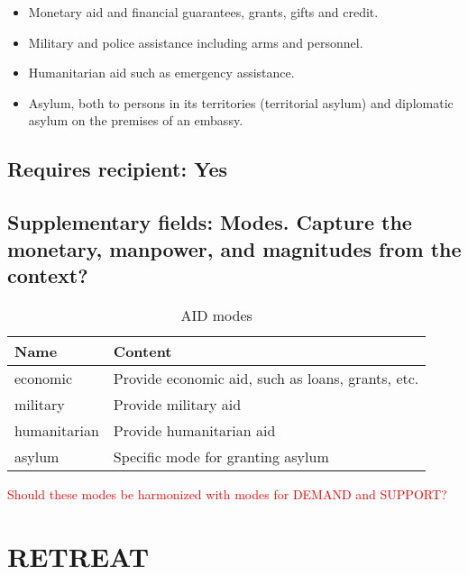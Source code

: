 \documentclass[11pt]{report}
\newcommand{\plcat}[1]{\textsf{#1}}
\newcommand{\andy}[1]{\textcolor{red}{#1}}
\begin{document}
\begin{itemize}

\item Monetary aid and financial guarantees, grants, gifts and credit.

\item Military and police assistance including arms and personnel.

\item Humanitarian aid such as emergency assistance.

\item Asylum, both to persons in its territories (territorial asylum) and diplomatic asylum on the premises of an embassy.

\end{itemize}

\subsection{Requires recipient: Yes}

\subsection{Supplementary fields: Modes. Capture the monetary, manpower, and magnitudes from the context?}

\begin{table}[htp]
\color{red}
\caption{AID modes}
\begin{center}
\begin{tabular}{|l|p{13cm}|}
\hline
Name & Content \\
\hline
economic & Provide economic aid, such as loans, grants, etc.\\
military & Provide military aid \\
humanitarian & Provide humanitarian aid \\
asylum & Specific mode for granting asylum\\
\hline
\end{tabular}
\end{center}
\label{tab:aidtmode}
\end{table}%

\andy{Should these modes be harmonized with modes for \plcat{DEMAND} and \plcat{SUPPORT}?}

\bigskip  


\section{RETREAT}
\end{document}
